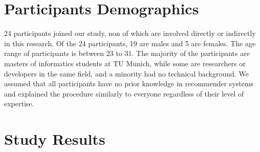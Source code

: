 \section{Participants Demographics}
24 participants joined our study, non of which are involved directly or
indirectly in this research.
Of the 24 participants, 19 are males and 5 are females. The age range of
participants is between 23 to 31. The majority of the participants are masters
of informatics students at TU Munich, while some are researchers or developers
in the same field, and a minority had no technical background. We assumed that
all participants have no prior knowledge in recommender systems and explained the procedure similarly to everyone regardless
of their level of expertise.

\section{Study Results}
